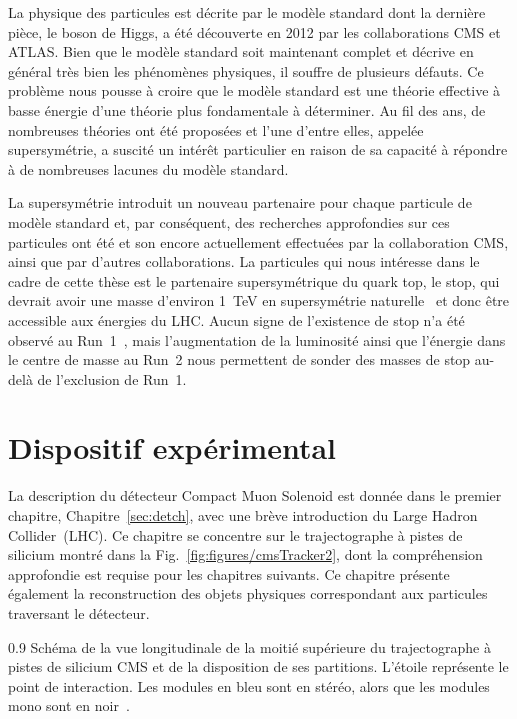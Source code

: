 La physique des particules est décrite par le modèle standard dont la dernière pièce, le boson de Higgs, a été découverte en 2012 par les collaborations CMS et ATLAS. Bien que le modèle standard soit maintenant complet et décrive en général très bien les phénomènes physiques, il souffre de plusieurs défauts. Ce problème nous pousse à croire que le modèle standard est une théorie effective à basse énergie d’une théorie plus fondamentale à déterminer. Au fil des ans, de nombreuses théories ont été proposées et l'une d'entre elles, appelée supersymétrie, a suscité un intérêt particulier en raison de sa capacité à répondre à de nombreuses lacunes du modèle standard.

La supersymétrie introduit un nouveau partenaire pour chaque particule de modèle standard et, par conséquent, des recherches approfondies sur ces particules ont été et son encore actuellement effectuées par la collaboration CMS, ainsi que par d’autres collaborations. La particules qui nous intéresse dans le cadre de cette thèse est le partenaire supersymétrique du quark top, le stop, qui devrait avoir une masse d'environ 1~TeV en supersymétrie naturelle~\cite{Martin:1997ns, Barbieri:1987fn, Papucci:2011wy} et donc être accessible aux énergies du LHC. Aucun signe de l'existence de stop n'a été observé au Run~1~\cite{website:SUSYresRunI}, mais l'augmentation de la luminosité ainsi que l'énergie dans le centre de masse au Run~2 nous permettent de sonder des masses de stop au-delà de l'exclusion de Run~1.

\section{Dispositif expérimental}


La description du  détecteur Compact Muon Solenoid est donnée dans le premier chapitre, Chapitre~\ref{sec:detch}, avec une brève introduction du Large Hadron Collider~(LHC). Ce chapitre se concentre sur le trajectographe à pistes de silicium montré dans la Fig.~\ref{fig:figures/cmsTracker2}, dont la compréhension approfondie est requise pour les chapitres suivants. Ce chapitre présente également la reconstruction des objets physiques correspondant aux particules traversant le détecteur. 

                 {0.9}
                 { Schéma de la vue longitudinale de la moitié supérieure du trajectographe à pistes de silicium CMS et de la disposition de ses partitions. L'étoile représente le point de interaction. Les modules en bleu sont en stéréo, alors que les modules mono sont en noir~\cite{Chatrchyan:2014fea}.}

